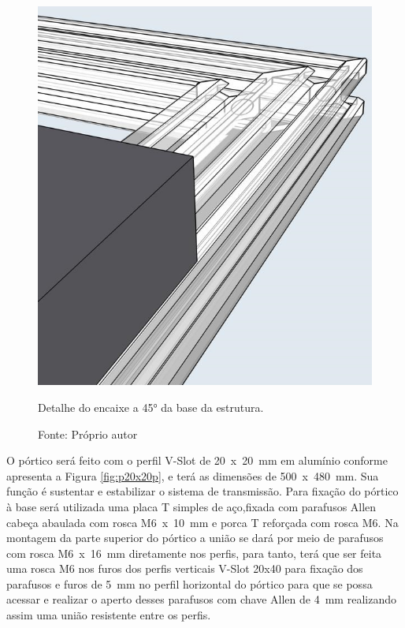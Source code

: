 \begin{figure}[H]
\centering
\includegraphics[scale = 0.5]{figuras/detalhe45}
\caption{Detalhe do encaixe a 45° da base da estrutura.}
\caption*{Fonte: Próprio autor}
\label{fig:detalhe45}
\end{figure}
    
O pórtico será feito com o perfil V-Slot de 20~x~20~mm em alumínio conforme apresenta 
a Figura \ref{fig:p20x20p}, e terá as dimensões de 500~x~480~mm. Sua função é sustentar 
e estabilizar o sistema de transmissão. Para fixação do pórtico à base será utilizada 
uma placa T simples de aço,fixada com parafusos Allen cabeça abaulada com rosca M6~x~10~mm 
e porca T reforçada com rosca M6. Na montagem da parte superior do pórtico a união 
se dará por meio de parafusos com rosca M6~x~16~mm diretamente nos perfis, para tanto, 
terá que ser feita uma rosca M6 nos furos dos perfis verticais V-Slot 20x40 para 
fixação dos parafusos e furos de 5~mm no perfil horizontal do pórtico para que se 
possa acessar e realizar o aperto desses parafusos com chave Allen de 4~mm realizando 
assim uma união resistente entre os perfis.


